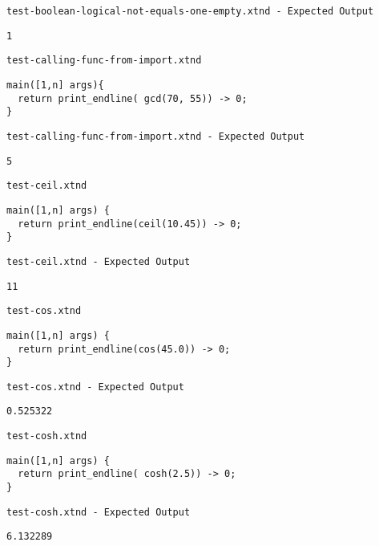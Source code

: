 \medskip \noindent \texttt{test-boolean-logical-not-equals-one-empty.xtnd - Expected Output}


\begin{lstlisting}
1
\end{lstlisting}


\medskip \noindent \texttt{test-calling-func-from-import.xtnd}


\begin{lstlisting}
main([1,n] args){
  return print_endline( gcd(70, 55)) -> 0;
}
\end{lstlisting}


\medskip \noindent \texttt{test-calling-func-from-import.xtnd - Expected Output}


\begin{lstlisting}
5
\end{lstlisting}


\medskip \noindent \texttt{test-ceil.xtnd}


\begin{lstlisting}
main([1,n] args) {
  return print_endline(ceil(10.45)) -> 0;
}
\end{lstlisting}


\medskip \noindent \texttt{test-ceil.xtnd - Expected Output}


\begin{lstlisting}
11
\end{lstlisting}


\medskip \noindent \texttt{test-cos.xtnd}


\begin{lstlisting}
main([1,n] args) {
  return print_endline(cos(45.0)) -> 0;
}
\end{lstlisting}


\medskip \noindent \texttt{test-cos.xtnd - Expected Output}


\begin{lstlisting}
0.525322
\end{lstlisting}


\medskip \noindent \texttt{test-cosh.xtnd}


\begin{lstlisting}
main([1,n] args) {
  return print_endline( cosh(2.5)) -> 0;
}
\end{lstlisting}


\medskip \noindent \texttt{test-cosh.xtnd - Expected Output}


\begin{lstlisting}
6.132289
\end{lstlisting}


